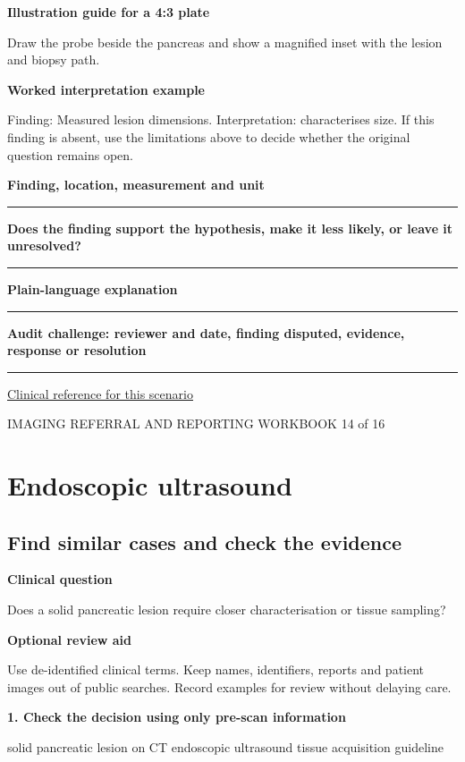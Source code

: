 \documentclass[11pt,a4paper]{article}
\newcommand{\record}[1]{\textbf{#1}\par\vspace{0.55\baselineskip}\hrule\vspace{0.35\baselineskip}}
\begin{document}
\textbf{Illustration guide for a 4:3 plate}\par Draw the probe beside the pancreas and show a magnified inset with the lesion and biopsy path.\par

\textbf{Worked interpretation example}\par Finding: Measured lesion dimensions. Interpretation: characterises size. If this finding is absent, use the limitations above to decide whether the original question remains open.\par

\record{Finding, location, measurement and unit}

\record{Does the finding support the hypothesis, make it less likely, or leave it unresolved?}

\record{Plain-language explanation}

\record{Audit challenge: reviewer and date, finding disputed, evidence, response or resolution}

\small\href{https://pubmed.ncbi.nlm.nih.gov/39387777/}{Clinical reference for this scenario}

\normalsize

\newpage

{\small IMAGING REFERRAL AND REPORTING WORKBOOK \hfill 14 of 16}

\section*{Endoscopic ultrasound}

\subsection*{Find similar cases and check the evidence}

\textbf{Clinical question}\par Does a solid pancreatic lesion require closer characterisation or tissue sampling?\par

\textbf{Optional review aid}\par Use de-identified clinical terms. Keep names, identifiers, reports and patient images out of public searches. Record examples for review without delaying care.\par

\textbf{1. Check the decision using only pre-scan information}\par solid pancreatic lesion on CT endoscopic ultrasound tissue acquisition guideline\par
\end{document}
